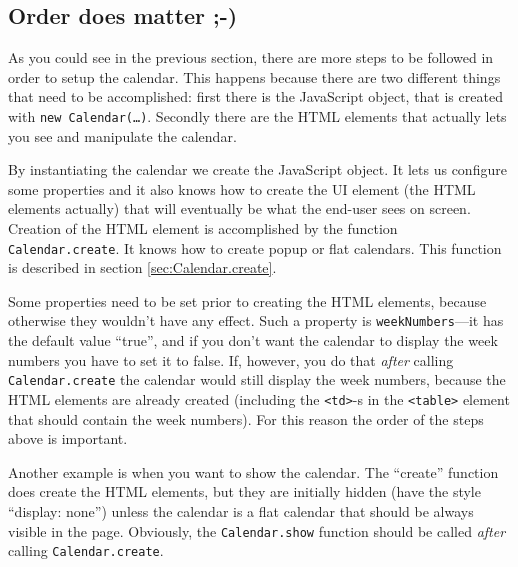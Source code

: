 \documentclass[a4paper,twoside,10pt]{dynadoc}
\begin{document}
\subsection{Order does matter ;-)}

As you could see in the previous section, there are more steps to be followed
in order to setup the calendar.  This happens because there are two different
things that need to be accomplished: first there is the JavaScript object, that
is created with \texttt{new Calendar(\ldots)}.  Secondly there are the HTML
elements that actually lets you see and manipulate the calendar.

{\begin{small}
\end{small}}

By instantiating the calendar we create the JavaScript object.  It lets us
configure some properties and it also knows how to create the UI element (the
HTML elements actually) that will eventually be what the end-user sees on
screen.  Creation of the HTML element is accomplished by the function
\texttt{Calendar.create}.  It knows how to create popup or flat calendars.
This function is described in section \ref{sec:Calendar.create}.

Some properties need to be set prior to creating the HTML elements, because
otherwise they wouldn't have any effect.  Such a property is
\texttt{weekNumbers}---it has the default value ``true'', and if you don't
want the calendar to display the week numbers you have to set it to false.  If,
however, you do that \emph{after} calling \texttt{Calendar.create} the calendar
would still display the week numbers, because the HTML elements are already
created (including the \texttt{<td>}-s in the \texttt{<table>} element that
should contain the week numbers).  For this reason the order of the steps above
is important.

Another example is when you want to show the calendar.  The ``create'' function
does create the HTML elements, but they are initially hidden (have the style
``display: none'') unless the calendar is a flat calendar that should be always
visible in the page.  Obviously, the \texttt{Calendar.show} function should be
called \emph{after} calling \texttt{Calendar.create}.
\end{document}
